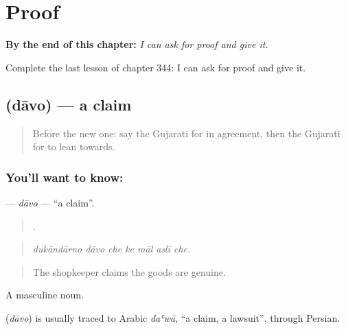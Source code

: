 
\chapter{Proof}
\label{ch:gu-proof}

\begin{chapteropening}
\textbf{By the end of this chapter:} \emph{I can ask for proof and give it.}

Complete the last lesson of chapter 344: I can ask for proof and give it.
\end{chapteropening}

\section[\texorpdfstring{\gu{દાવો} (dāvo)}{દાવો (dāvo)}]{ (dāvo) — a claim}

\label{lesson:GU-C344-davo}



\begin{quote}
Before the new one: say the Gujarati for in agreement, then the Gujarati for to lean towards.
\end{quote}

\subsection*{You'll want to know: }
\textbf{} — \emph{dāvo} — \textquotedblleft{}a claim\textquotedblright{}.

\begin{quote}
      .
\end{quote}

\begin{quote}
\emph{dukāndārno dāvo che ke māl aslī che.}
\end{quote}

\begin{quote}
The shopkeeper claims the goods are genuine.
\end{quote}

A masculine noun.

\begin{cousinweb}
\textbf{} (\emph{dāvo}) is usually traced to Arabic \emph{daʿwā}, \textquotedblleft{}a claim, a lawsuit\textquotedblright{}, through Persian.
\end{cousinweb}

